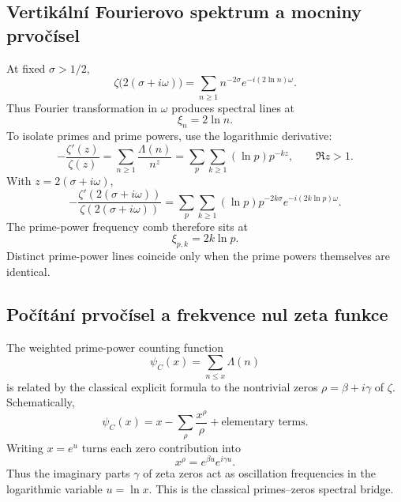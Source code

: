 \subsection{Vertikální Fourierovo spektrum a mocniny prvočísel}

At fixed $\sigma>1/2$,
\begin{equation}
 \zeta\bigl(2(\sigma+i\omega)\bigr)
 =\sum_{n\ge1}n^{-2\sigma}e^{-i(2\ln n)\omega}.
 \label{eq:zeta-vertical-fourier}
\end{equation}
Thus Fourier transformation in $\omega$ produces spectral lines at
\begin{equation}
 \xi_n=2\ln n.
\end{equation}
To isolate primes and prime powers, use the logarithmic derivative:
\begin{equation}
 -\frac{\zeta'(z)}{\zeta(z)}
 =\sum_{n\ge1}\frac{\Lambda(n)}{n^z}
 =\sum_p\sum_{k\ge1}(\ln p)p^{-kz},
 \qquad \Re z>1.
 \label{eq:log-derivative-von-mangoldt}
\end{equation}
With $z=2(\sigma+i\omega)$,
\begin{equation}
 -\frac{\zeta'\!\left(2(\sigma+i\omega)\right)}
        {\zeta\!\left(2(\sigma+i\omega)\right)}
 =\sum_p\sum_{k\ge1}
   (\ln p)p^{-2k\sigma}
   e^{-i(2k\ln p)\omega}.
 \label{eq:prime-power-fourier-comb}
\end{equation}
The prime-power frequency comb therefore sits at
\begin{equation}
 \boxed{\xi_{p,k}=2k\ln p.}
 \label{eq:prime-power-frequencies}
\end{equation}
Distinct prime-power lines coincide only when the prime powers themselves are identical.

\subsection{Počítání prvočísel a frekvence nul zeta funkce}

The weighted prime-power counting function
\begin{equation}
 \psi_C(x)=\sum_{n\le x}\Lambda(n)
\end{equation}
is related by the classical explicit formula to the nontrivial zeros
$\rho=\beta+i\gamma$ of $\zeta$.  Schematically,
\begin{equation}
 \psi_C(x)=x-\sum_\rho\frac{x^\rho}{\rho}+\text{elementary terms}.
 \label{eq:explicit-formula-schematic}
\end{equation}
Writing $x=e^u$ turns each zero contribution into
\begin{equation}
 x^\rho=e^{\beta u}e^{i\gamma u}.
\end{equation}
Thus the imaginary parts $\gamma$ of zeta zeros act as oscillation frequencies in the
logarithmic variable $u=\ln x$.  This is the classical primes--zeros spectral bridge.

